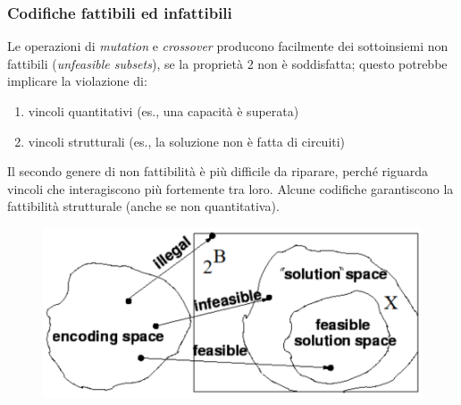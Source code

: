 \documentclass{article}
\begin{document}
\subsubsection{Codifiche fattibili ed infattibili}
Le operazioni di \textit{mutation} e \textit{crossover} producono facilmente dei
sottoinsiemi non fattibili (\textit{unfeasible subsets}), se la proprietà 2
non è soddisfatta; questo potrebbe implicare la violazione di:
\begin{enumerate}
    \item vincoli quantitativi (es., una capacità è superata)
    \item vincoli strutturali (es., la soluzione non è fatta di circuiti)
\end{enumerate}
Il secondo genere di non fattibilità è più difficile da riparare, perché
riguarda vincoli che interagiscono più fortemente tra loro. Alcune codifiche
garantiscono la fattibilità strutturale (anche se non quantitativa).
\begin{figure}[H]
    \centering
    \includegraphics[scale=0.5]{images/quantstruct.png}
\end{figure}
\end{document}
